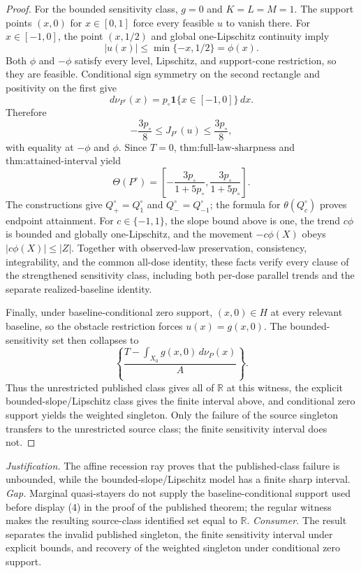 \documentclass{article}
\begin{document}
\begin{proof}
For the bounded sensitivity class, \(g=0\) and \(K=L=M=1\).  The support points \((x,0)\) for \(x\in[0,1]\) force every feasible \(u\) to vanish there.  For \(x\in[-1,0]\), the point \((x,1/2)\) and global one-Lipschitz continuity imply
\[
 |u(x)|\leq\min\{-x,1/2\}=\phi(x).
\]
Both \(\phi\) and \(-\phi\) satisfy every level, Lipschitz, and support-cone restriction, so they are feasible.  Conditional sign symmetry on the second rectangle and positivity on the first give
\[
 d\nu_{P^{\circ}}(x)=p_{\circ}\mathbf1\{x\in[-1,0]\}\,dx.
\]
Therefore
\[
 -\frac{3p_{\circ}}8\leq J_{P^{\circ}}(u)\leq\frac{3p_{\circ}}8,
\]
with equality at \(-\phi\) and \(\phi\).  Since \(T=0\), \(\text{thm:full-law-sharpness}\) and \(\text{thm:attained-interval}\) yield
\[
 \Theta(P^{\circ})=
 \left[-\frac{3p_{\circ}}{1+5p_{\circ}},
        \frac{3p_{\circ}}{1+5p_{\circ}}\right].
\]
The constructions give \(Q_+^{\circ}=Q_1^{\circ}\) and \(Q_-^{\circ}=Q_{-1}^{\circ}\); the formula for \(\theta(Q_c^{\circ})\) proves endpoint attainment.  For \(c\in\{-1,1\}\), the slope bound above is one, the trend \(c\phi\) is bounded and globally one-Lipschitz, and the movement \(-c\phi(X)\) obeys \(|c\phi(X)|\leq|Z|\).  Together with observed-law preservation, consistency, integrability, and the common all-dose identity, these facts verify every clause of the strengthened sensitivity class, including both per-dose parallel trends and the separate realized-baseline identity.

Finally, under baseline-conditional zero support, \((x,0)\in H\) at every relevant baseline, so the obstacle restriction forces \(u(x)=g(x,0)\).  The bounded-sensitivity set then collapses to
\[
 \left\{\frac{T-\int_{X_0}g(x,0)\,d\nu_P(x)}{A}\right\}.
\]
Thus the unrestricted published class gives all of \(\mathbb R\) at this witness, the explicit bounded-slope/Lipschitz class gives the finite interval above, and conditional zero support yields the weighted singleton.  Only the failure of the source singleton transfers to the unrestricted source class; the finite sensitivity interval does not.
\end{proof}
\par\smallskip\noindent \textit{Justification.} The affine recession ray proves that the published-class failure is unbounded, while the bounded-slope/Lipschitz model has a finite sharp interval. \textit{Gap.} Marginal quasi-stayers do not supply the baseline-conditional support used before display (4) in the proof of the published theorem; the regular witness makes the resulting source-class identified set equal to \(\mathbb R\). \textit{Consumer.} The result separates the invalid published singleton, the finite sensitivity interval under explicit bounds, and recovery of the weighted singleton under conditional zero support.
\end{document}
